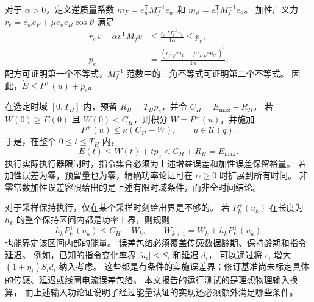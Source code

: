 对于 $\alpha>0$，定义逆质量系数 $m_F=e_w^{\mathsf T}M_f^{-1}e_w$ 和
$m_\vartheta=e_\vartheta^{\mathsf T}M_f^{-1}e_\vartheta$。
加性广义力 $r_e=e_we_F+\mu e_\vartheta e_B\cos\vartheta$ 满足
\begin{align}
 r_e^{\mathsf T}v-\alpha v^{\mathsf T}M_fv
 &\le\frac{r_e^{\mathsf T}M_f^{-1}r_e}{4\alpha}\le p_e,\nonumber\\
 p_e&=\frac{(\epsilon_F\sqrt{m_F}
                  +\mu\epsilon_B\sqrt{m_\vartheta})^2}{4\alpha}.
 \label{sm:additive-power}
\end{align}
配方可证明第一个不等式，$M_f^{-1}$ 范数中的三角不等式可证明第二个不等式。
因此，$\dot E\le P^+(u)+p_e$。

在选定时域 $[0,T_H]$ 内，预留 $R_H=T_Hp_e$，并令 $C_H=E_{\max}-R_H$。
若 $W(0)\ge E(0)$ 且 $W(0)<C_H$，则积分 $\dot W=P^+(u)$，并施加
\begin{equation}
 P^+(u)\le\kappa(C_H-W),\qquad u\in\mathcal U(q).
 \label{sm:robust-governor}
\end{equation}
于是，在整个 $0\le t\le T_H$ 内，
\begin{equation}
 E(t)\le W(t)+tp_e<C_H+R_H=E_{\max}.
 \label{sm:robust-energy}
\end{equation}
执行实际执行器限制时，指令集合必须为上述增益误差和加性误差保留裕量。
若加性误差为零，预留量也为零，精确功率论证可在 $\alpha\ge0$ 时扩展到所有时间。
非零常数加性误差容限给出的是上述有限时域条件，而非全时间结论。

对于采样保持执行，仅在某个采样时刻给出界是不够的。
若 $P_k^+(u_k)$ 在长度为 $h_k$ 的整个保持区间内都是功率上界，则规则
\begin{equation}
 h_kP_k^+(u_k)\le C_H-W_k,\qquad
 W_{k+1}=W_k+h_kP_k^+(u_k)
 \label{sm:discrete-work}
\end{equation}
也能界定该区间内部的能量。
误差包络必须覆盖传感数据龄期、保持龄期和指令延迟。
例如，已知的指令变化率界 $|\dot u_i|\le S_i$ 和延迟 $d_i$，
可以通过将 $\epsilon_i$ 增大 $(1+\eta_i)S_id_i$ 纳入考虑。
这些都是有条件的实施误差界；修订基准尚未标定具体的传感、延迟或线圈电流误差包络。
本文报告的运行测试的是理想物理输入换算，
而上述输入功论证说明了经过能量认证的实现还必须额外满足哪些条件。
